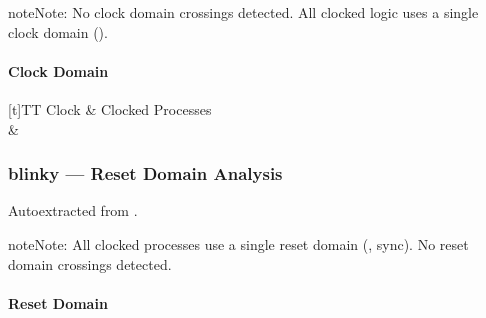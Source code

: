 \documentclass[letterpaper,10pt,english]{sphinxmanual}
\begin{document}
\begin{sphinxadmonition}{note}{Note:}
\sphinxAtStartPar
No clock domain crossings detected. All clocked logic uses a single clock domain ().
\end{sphinxadmonition}


\paragraph{Clock Domain}
\label{\detokenize{modules/blinky/cdc:clock-domain}}

\begin{savenotes}\sphinxattablestart
\sphinxthistablewithglobalstyle
\centering
\begin{tabulary}{\linewidth}[t]{TT}
\sphinxtoprule
\sphinxstyletheadfamily 
\sphinxAtStartPar
Clock
&\sphinxstyletheadfamily 
\sphinxAtStartPar
Clocked Processes
\\
\sphinxmidrule
\sphinxtableatstartofbodyhook
\sphinxAtStartPar
{}
&
\sphinxAtStartPar
{}
\\
\sphinxbottomrule
\end{tabulary}
\sphinxtableafterendhook\par
\sphinxattableend\end{savenotes}

\sphinxstepscope


\subsubsection{blinky — Reset Domain Analysis}
\label{\detokenize{modules/blinky/reset:blinky-reset-domain-analysis}}\label{\detokenize{modules/blinky/reset::doc}}
\sphinxAtStartPar
Auto\sphinxhyphen{}extracted from .

\begin{sphinxadmonition}{note}{Note:}
\sphinxAtStartPar
All clocked processes use a single reset domain (, sync). No reset domain crossings detected.
\end{sphinxadmonition}


\paragraph{Reset Domain}
\label{\detokenize{modules/blinky/reset:reset-domain}}
\end{document}
